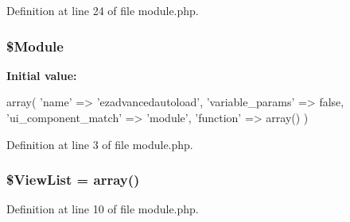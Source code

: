 \-Definition at line 24 of file module.\-php.

\hypertarget{module_8php_a643d60fb839b5d58f0725a88d0ecd1a0}{
\subsubsection[{\$\-Module}]{\setlength{\rightskip}{0pt plus 5cm}\$\-Module}}\label{module_8php_a643d60fb839b5d58f0725a88d0ecd1a0}
{\bfseries \-Initial value\-:}
\begin{DoxyCode}
 array(
                                        'name' => 'ezadvancedautoload',
                                        'variable_params' => false,
                                        'ui_component_match' => 'module',
                                        'function' => array()
)
\end{DoxyCode}


\-Definition at line 3 of file module.\-php.

\hypertarget{module_8php_a8e0c26fc38651904852a8f967a548fa2}{
\subsubsection[{\$\-View\-List}]{\setlength{\rightskip}{0pt plus 5cm}\$\-View\-List = array()}}\label{module_8php_a8e0c26fc38651904852a8f967a548fa2}


\-Definition at line 10 of file module.\-php.

